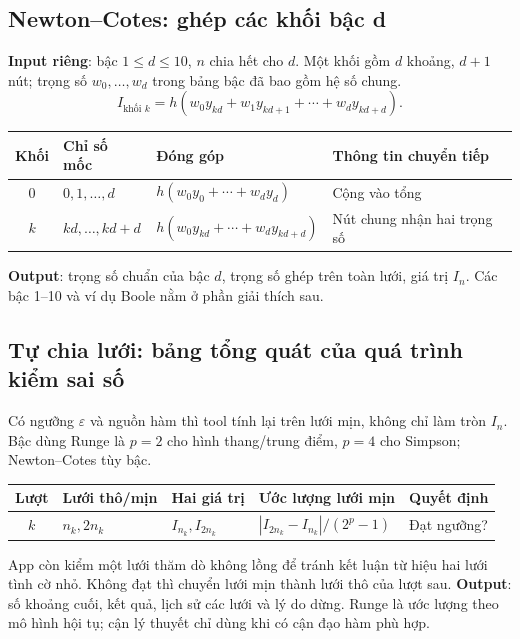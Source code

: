 \subsection{Newton--Cotes: ghép các khối bậc d}
\textbf{Input riêng}: bậc $1\le d\le10$, $n$ chia hết cho $d$. Một khối gồm $d$ khoảng, $d+1$ nút; trọng số $w_0,\ldots,w_d$ trong bảng bậc đã bao gồm hệ số chung.
\[
I_{\text{khối }k}=h(w_0y_{kd}+w_1y_{kd+1}+\cdots+w_dy_{kd+d}).
\]
\begin{center}\small\begin{tabular}{clll}\toprule
Khối&Chỉ số mốc&Đóng góp&Thông tin chuyển tiếp\\\midrule
0&$0,1,\ldots,d$&$h(w_0y_0+\cdots+w_dy_d)$&Cộng vào tổng\\
$k$&$kd,\ldots,kd+d$&$h(w_0y_{kd}+\cdots+w_dy_{kd+d})$&Nút chung nhận hai trọng số\\\bottomrule
\end{tabular}\end{center}
\textbf{Output}: trọng số chuẩn của bậc $d$, trọng số ghép trên toàn lưới, giá trị $I_n$. Các bậc 1--10 và ví dụ Boole nằm ở phần giải thích sau.

\subsection{Tự chia lưới: bảng tổng quát của quá trình kiểm sai số}
Có ngưỡng $\varepsilon$ và nguồn hàm thì tool tính lại trên lưới mịn, không chỉ làm tròn $I_n$. Bậc dùng Runge là $p=2$ cho hình thang/trung điểm, $p=4$ cho Simpson; Newton--Cotes tùy bậc.
\begin{center}\small\begin{tabular}{cllll}\toprule
Lượt&Lưới thô/mịn&Hai giá trị&Ước lượng lưới mịn&Quyết định\\\midrule
$k$&$n_k,2n_k$&$I_{n_k},I_{2n_k}$&$|I_{2n_k}-I_{n_k}|/(2^p-1)$&Đạt ngưỡng?\\\bottomrule
\end{tabular}\end{center}
App còn kiểm một lưới thăm dò không lồng để tránh kết luận từ hiệu hai lưới tình cờ nhỏ. Không đạt thì chuyển lưới mịn thành lưới thô của lượt sau. \textbf{Output}: số khoảng cuối, kết quả, lịch sử các lưới và lý do dừng. Runge là ước lượng theo mô hình hội tụ; cận lý thuyết chỉ dùng khi có cận đạo hàm phù hợp.

